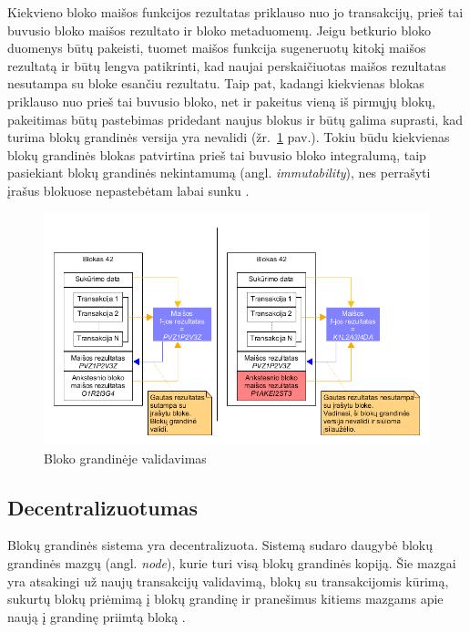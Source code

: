 Kiekvieno bloko maišos funkcijos rezultatas priklauso nuo jo transakcijų, prieš tai buvusio bloko maišos rezultato ir bloko metaduomenų.
Jeigu betkurio bloko duomenys būtų pakeisti, tuomet maišos funkcija sugeneruotų kitokį maišos rezultatą ir būtų lengva patikrinti, kad
naujai perskaičiuotas maišos rezultatas nesutampa su bloke esančiu rezultatu. Taip pat, kadangi kiekvienas blokas
priklauso nuo prieš tai buvusio bloko, net ir pakeitus vieną iš pirmųjų blokų, pakeitimas būtų pastebimas pridedant naujus blokus ir būtų galima suprasti,
kad turima blokų grandinės versija yra nevalidi (žr.~\ref{fig:blockchainNotIntact} pav.). Tokiu būdu kiekvienas blokų grandinės blokas patvirtina prieš tai
buvusio bloko integralumą, taip pasiekiant blokų grandinės nekintamumą (angl. \textit{immutability}),
nes perrašyti įrašus blokuose nepastebėtam labai sunku \cite{SatoshiNakamoto}.

\begin{figure}[H]
    \centering
    \includegraphics[scale=0.6]{img/blokchainNotIntact}
    \caption{Bloko grandinėje validavimas}
    \label{fig:blockchainNotIntact}
\end{figure}

\subsection{Decentralizuotumas}

Blokų grandinės sistema yra decentralizuota. Sistemą sudaro daugybė blokų grandinės mazgų (angl. \textit{node}), kurie turi visą blokų grandinės kopiją. Šie mazgai
yra atsakingi už naujų transakcijų validavimą, blokų su transakcijomis kūrimą, sukurtų blokų priėmimą į blokų grandinę ir pranešimus kitiems mazgams apie naują į grandinę priimtą
bloką \cite{Antonopoulos2016}.

